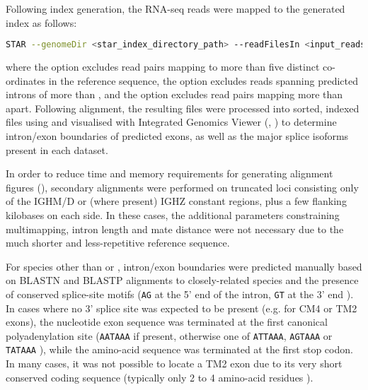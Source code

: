 \noindent Following index generation, the RNA-seq reads were mapped to the generated index as follows:

\begin{lstlisting}[language=bash]
STAR --genomeDir <star_index_directory_path> --readFilesIn <input_reads> --outFilterMultimapNmax 5 --alignIntronMax 10000 --alignMatesGapMax 10000
\end{lstlisting}

\noindent where the  option excludes read pairs mapping to more than five distinct co-ordinates in the reference sequence, the  option excludes reads spanning predicted introns of more than , and the  option excludes read pairs mapping more than  apart. Following alignment, the resulting  files were processed into sorted, indexed  files using  \parencite{li2009samtools} and visualised with Integrated Genomics Viewer (, \parencite{robinson2011igv,thorvaldsdottir2013igv}) to determine intron/exon boundaries of predicted exons, as well as the major splice isoforms present in each dataset.

In order to reduce time and memory requirements for generating alignment figures (), secondary alignments were performed on truncated loci consisting only of the IGHM/D or (where present) IGHZ constant regions, plus a few flanking kilobases on each side. In these cases, the additional parameters constraining multimapping, intron length and mate distance were not necessary due to the much shorter and less-repetitive reference sequence.

For species other than \Nfu or \Xma, intron/exon boundaries were predicted manually based on BLASTN and BLASTP alignments to closely-related species and the presence of conserved splice-site motifs (\texttt{AG} at the 5' end of the intron, \texttt{GT} at the 3' end \parencite{shapiro1987splice}). In cases where no 3' splice site was expected to be present (e.g. for CM4 or TM2 exons), the nucleotide exon sequence was terminated at the first canonical polyadenylation site (\texttt{AATAAA} if present, otherwise one of \texttt{ATTAAA}, \texttt{AGTAAA} or \texttt{TATAAA} \parencite{ulitsky2012polya}), while the amino-acid sequence was terminated at the first stop codon. In many cases, it was not possible to locate a TM2 exon due to its very short conserved coding sequence (typically only 2 to 4 amino-acid residues \parencite{bao2010stickleback,danilova2005zebrafish}).

